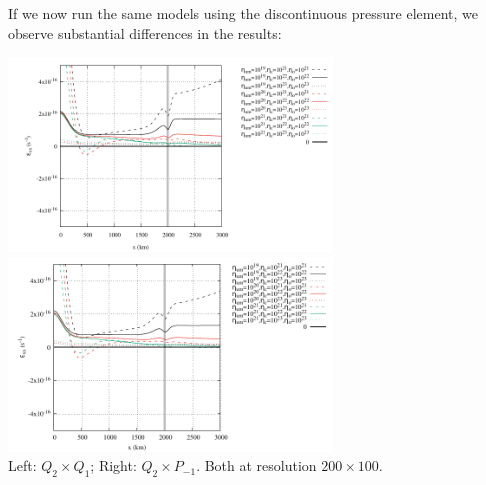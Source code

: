 If we now run the same models using the discontinuous pressure element, we
observe substantial differences in the results:

\begin{center}
\includegraphics[width=8.6cm]{python_codes/fieldstone_143/results/fig4/fig4a}
\includegraphics[width=8.6cm]{python_codes/fieldstone_143/results/fig4_q2pm1/fig4a}\\
{\captionfont  Left: $Q_2\times Q_1$; Right: $Q_2\times P_{-1}$. Both at resolution $200\times 100$.}
\end{center}

 

